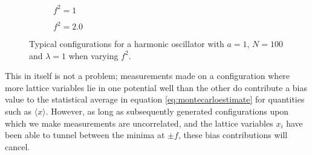 \documentclass[12pt]{article}
\begin{document}
\begin{figure}
\begin{subfigure}[b]{0.5\textwidth}
                        \caption{$f^2=1$}
                        \label{fig:IsolatedAnharmonicModeF2}
                    \end{subfigure}
                    \begin{subfigure}[b]{0.5\textwidth}
                        \caption{$f^2=2.0$}
                        \label{fig:IsolatedAnharmonicModeF3}
                    \end{subfigure}
                    \caption{Typical configurations for a harmonic oscillator with $a=1$, $N=100$ and $\lambda=1$ when varying $f^2$.}
                    \label{fig:IsolatedAnharmonicModes}
                \end{figure} 
    This in itself is not a problem; measurements made on a configuration where more lattice variables lie in one potential well than the other do contribute a bias value to the statistical average in equation \ref{eq:montecarloestimate} for quantities such as $\langle x \rangle$. However, as long as subsequently generated configurations upon which we make measurements are uncorrelated, and the lattice variables $x_i$ have been able to tunnel between the minima at $\pm f$, these bias contributions will cancel.
\end{document}
